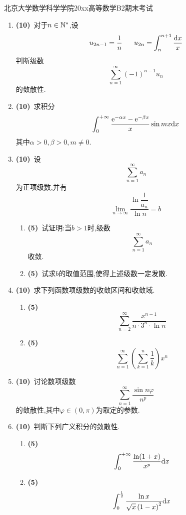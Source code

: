 \documentclass{ctexart}
\begin{document}
\pagestyle{empty}
\begin{center}\Large
    北京大学数学科学学院20xx高等数学B2期末考试
\end{center}
\begin{enumerate}[leftmargin=*,label=\textbf{\arabic*.},topsep=0pt,parsep=0pt,itemsep=0pt,partopsep=0pt]
    \item \textbf{(10)}\ 对于$n\in\mathbb{N}^*$,设
        \[u_{2n-1}=\dfrac1n\ \ \ \ \ u_{2n}=\int_n^{n+1}\dfrac{\di x}{x}\]
        判断级数
        \[\sum_{n=1}^{\infty}(-1)^{n-1}u_n\]
        的敛散性.

    \item \textbf{(10)}\ 求积分
        \[\int_0^{+\infty}\dfrac{\mathrm{e}^{-\alpha x}-\mathrm{e}^{-\beta x}}{x}\sin mx\mathrm{d} x\]
        其中$\alpha>0,\beta>0,m\neq0$.

    \item \textbf{(10)}\ 设
        \[\sum_{n=1}^{\infty}a_n\]
        为正项级数,并有
        \[\lim_{n\to\infty}\dfrac{\ln\dfrac{1}{a_n}}{\ln n}=b\]
        \begin{enumerate}[label=\tbf{(\arabic*)},topsep=0pt,parsep=0pt,itemsep=0pt,partopsep=0pt]
            \item \textbf{(5)}\ 试证明:当$b>1$时,级数
                \[\sum_{n=1}^{\infty}a_n\]
                收敛.
            \item \textbf{(5)}\ 试求$b$的取值范围,使得上述级数一定发散.
        \end{enumerate}

    \item \textbf{(10)}\ 求下列函数项级数的收敛区间和收敛域.
        \begin{enumerate}[label=\tbf{(\arabic*)},topsep=0pt,parsep=0pt,itemsep=0pt,partopsep=0pt]
            \item \textbf{(5)}\ 
                \[\sum_{n=2}^{\infty}\dfrac{x^{n-1}}{n\cdot3^n\cdot\ln n}\]
            \item \textbf{(5\songti{分})}\ 
                \[\sum_{n=1}^{\infty}\left(\sum_{k=1}^{n}\dfrac{1}{k}\right)x^n\]

        \end{enumerate}
        
    \item \textbf{(10)}\ 讨论数项级数
        \[\sum_{n=1}^{\infty}\dfrac{\sin n\varphi}{n^p}\]
        的敛散性,其中$\varphi\in(0,\pi)$为取定的参数.

    \item \textbf{(10)}\ 判断下列广义积分的敛散性.
        \begin{enumerate}[label=\tbf{(\arabic*)},topsep=0pt,parsep=0pt,itemsep=0pt,partopsep=0pt]
            \item \textbf{(5)}
                \[\int_0^{+\infty}\dfrac{\ln(1+x)}{x^p}\mathrm{d} x\]
            \item \textbf{(5\songti{分})}
                \[\int_0^{\frac12}\dfrac{\ln x}{\sqrt{x}\left(1-x\right)^2}\mathrm{d} x\]


\end{enumerate}
\end{enumerate}
\end{document}

